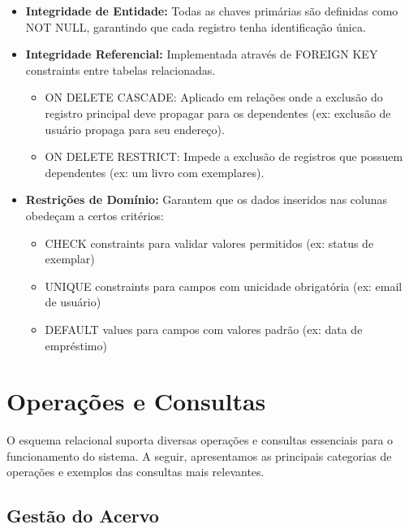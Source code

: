 \documentclass[12pt,a4paper]{article}
\begin{document}
\begin{conceptbox}
\begin{itemize}
    \item \textbf{Integridade de Entidade:} Todas as chaves primárias são definidas como NOT NULL, garantindo que cada registro tenha identificação única.
    
    \item \textbf{Integridade Referencial:} Implementada através de FOREIGN KEY constraints entre tabelas relacionadas.
    \begin{itemize}
        \item ON DELETE CASCADE: Aplicado em relações onde a exclusão do registro principal deve propagar para os dependentes (ex: exclusão de usuário propaga para seu endereço).
        \item ON DELETE RESTRICT: Impede a exclusão de registros que possuem dependentes (ex: um livro com exemplares).
    \end{itemize}
    
    \item \textbf{Restrições de Domínio:} Garantem que os dados inseridos nas colunas obedeçam a certos critérios:
    \begin{itemize}
        \item CHECK constraints para validar valores permitidos (ex: status de exemplar)
        \item UNIQUE constraints para campos com unicidade obrigatória (ex: email de usuário)
        \item DEFAULT values para campos com valores padrão (ex: data de empréstimo)
    \end{itemize}
\end{itemize}
\end{conceptbox}

\section{Operações e Consultas}

O esquema relacional suporta diversas operações e consultas essenciais para o funcionamento do sistema. A seguir, apresentamos as principais categorias de operações e exemplos das consultas mais relevantes.

\subsection{Gestão do Acervo}
\end{document}
